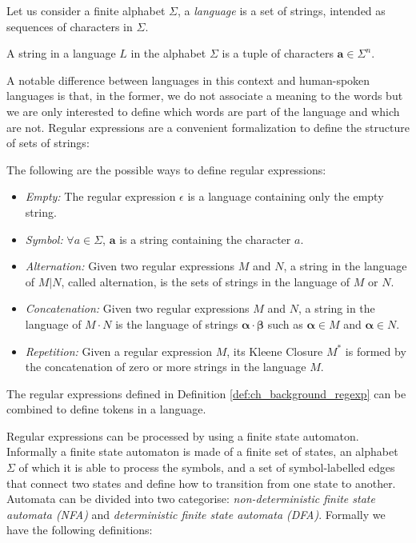 Let us consider a finite alphabet $\Sigma$, a \textit{language} is a set of strings, intended as sequences of characters in $\Sigma$.

\begin{definition}
	A string in a language $L$ in the alphabet $\Sigma$ is a tuple of characters $\mathbf{a} \in \Sigma^{n}$.
\end{definition}

 A notable difference between  languages in this context and human-spoken languages is that, in the former, we do not associate a meaning to the words but we are only interested to define which words are part of the language and which are not. Regular expressions are a convenient formalization to define the structure of sets of strings:

\begin{definition}
	\label{def:ch_background_regexp}
	 The following are the possible ways to define regular expressions:
	\begin{itemize}[noitemsep]
		\item \textit{Empty:} The regular expression $\epsilon$ is a language containing only the empty string.
		\item \textit{Symbol:} $\forall a \in \Sigma$, $\mathbf{a}$ is a string containing the character $a$.
		\item \textit{Alternation:} Given two regular expressions $M$ and $N$, a string in the language of $M | N$, called alternation, is the sets of strings in the language of $M$ or $N$.
		\item \textit{Concatenation:} Given two regular expressions $M$ and $N$, a string in the language of $M \cdot N$ is the language of strings $\mathbf{\alpha \cdot \beta}$ such as $\mathbf{\alpha} \in M$ and $\mathbf{\alpha} \in N$.
		\item \textit{Repetition:} Given a regular expression $M$, its Kleene Closure $M^{*}$ is formed by the concatenation of zero or more strings in the language $M$.
	\end{itemize}
\end{definition}

The regular expressions defined in Definition \ref{def:ch_background_regexp} can be combined to define tokens in a language.

Regular expressions can be processed by using a finite state automaton. Informally a finite state automaton is made of a finite set of states, an alphabet $\Sigma$ of which it is able to process the symbols, and a set of symbol-labelled edges that connect two states and define how to transition from one state to another. Automata can be divided into two categorise: \textit{non-deterministic finite state automata (NFA)} and \textit{deterministic finite state automata (DFA)}. Formally we have the following definitions:

